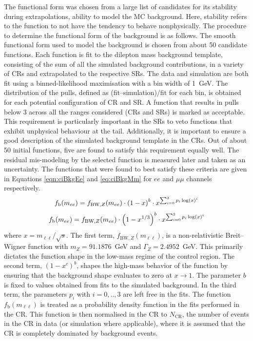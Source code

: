 The functional form was chosen from a large list of candidates for its stability during extrapolations, ability to model the MC background. Here, stability refers to the function to not have the tendency to behave nonphysically.
The procedure to determine the functional form of the background is as follows.
The smooth functional form used to model the background is chosen from about 50 candidate functions.
Each function is fit to the dilepton mass background template, consisting of the sum of all the simulated background contributions, in a variety of CRs and extrapolated to the respective SRs.
The data and simulation are both fit using a binned-likelihood maximisation with a bin width of 1~GeV.
The distribution of the pulls, defined as (fit--simulation)/fit for each bin, is obtained for each potential configuration of CR and SR.
A function that results in pulls below 3 across all the ranges considered (CRs and SRs) is marked as acceptable.
This requirement is particularly important in the SRs to veto functions that exhibit unphysical behaviour at the tail.
Additionally, it is important to ensure a good description of the simulated background template in the CRs.
Out of about 50 initial functions, five are found to satisfy this requirement equally well.
The residual mis-modeling by the selected function is measured later and taken as an uncertainty.
The functions that were found to best satisfy these criteria are given in Equations \ref{eqn:ciBkgEe} and \ref{eq:ciBkgMm} for $ee$ and $\mu\mu$ channels respectively.
\begin{equation}\begin{split} \label{eqn:ciBkgEe}
f_\textrm{b}(m_{ee}) &= f_{\mathrm{BW},Z}(m_{ee}) \cdot \left(1 - x\right)^{b} \cdot x^{\sum_{i=0}^3 p_i\log(x)^i} \\
\end{split}\end{equation} 
\begin{equation}\begin{split}\label{eqn:ciBkgMm}
f_\textrm{b}(m_{ee}) &= f_{\mathrm{BW},Z}(m_{ee}) \cdot \left(1 - x^{1/3}\right)^{b} \cdot x^{\sum_{i=0}^3 p_i\log(x)^i} \\
\end{split}\end{equation} 
where $x = m_{\ell\ell}/\sqrt{s}$.
The first term, $f_{\mathrm{BW},Z}(m_{\ell\ell})$, is a non-relativistic Breit--Wigner function with $m_Z = 91.1876$~GeV and $\Gamma_Z = 2.4952$~GeV.
This primarily dictates the function shape in the low-mass regime of the control region.
The second term, $(1-x^{c})^{b}$, shapes the high-mass behavior of the function by ensuring that the background shape evaluates to zero at $x\to 1$.
The parameter $b$ is fixed to values obtained from fits to the simulated background.
In the third term, the parameters $p_i$ with $i=0,..,3$ are left free in the fits.
The function $f_\textrm{b}(m_{\ell\ell})$ is treated as a probability density function in the fits performed in the CR.
This function is then normalised in the CR to $N_\textrm{CR}$, the number of events in the CR in data (or simulation where applicable), where it is assumed that the CR is completely dominated by background events.

